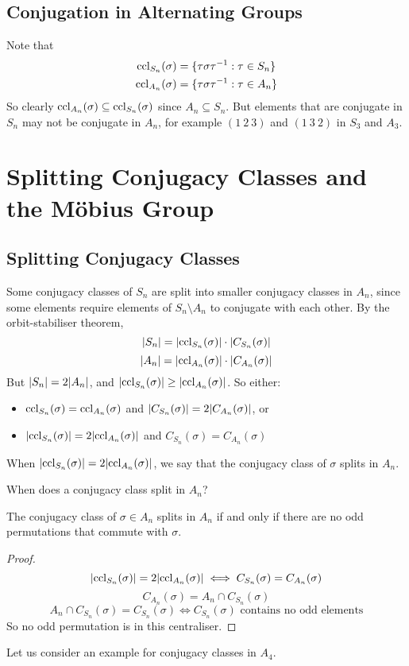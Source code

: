 \documentclass{article}
\begin{document}
\subsection{Conjugation in Alternating Groups}
Note that
\begin{align*}
    \operatorname{ccl}_{S_n}(\sigma) & = \{ \tau \sigma \tau^{-1} : \tau \in S_n \} \\
    \operatorname{ccl}_{A_n}(\sigma) & = \{ \tau \sigma \tau^{-1} : \tau \in A_n \}
\end{align*}
So clearly $\operatorname{ccl}_{A_n}(\sigma) \subseteq \operatorname{ccl}_{S_n}(\sigma)$ since $A_n \subseteq S_n$. But elements that are conjugate in $S_n$ may not be conjugate in $A_n$, for example $(1\ 2\ 3)$ and $(1\ 3\ 2)$ in $S_3$ and $A_3$.

\section{Splitting Conjugacy Classes and the M\"obius Group}
\subsection{Splitting Conjugacy Classes}
Some conjugacy classes of $S_n$ are split into smaller conjugacy classes in $A_n$, since some elements require elements of $S_n \setminus A_n$ to conjugate with each other. By the orbit-stabiliser theorem,
\[ \abs{S_n} = \abs{\operatorname{ccl}_{S_n}(\sigma)} \cdot \abs{C_{S_n}(\sigma)} \]
\[ \abs{A_n} = \abs{\operatorname{ccl}_{A_n}(\sigma)} \cdot \abs{C_{A_n}(\sigma)} \]
But $\abs{S_n} = 2\abs{A_n}$, and $\abs{\operatorname{ccl}_{S_n}(\sigma)} \geq \abs{\operatorname{ccl}_{A_n}(\sigma)}$. So either:
\begin{itemize}
    \item $\operatorname{ccl}_{S_n}(\sigma) = \operatorname{ccl}_{A_n}(\sigma)$ and $\abs{C_{S_n}(\sigma)} = 2\abs{C_{A_n}(\sigma)}$, or
    \item $\abs{\operatorname{ccl}_{S_n}(\sigma)} = 2 \abs{\operatorname{ccl}_{A_n}(\sigma)}$ and $C_{S_n}(\sigma) = C_{A_n}(\sigma)$
\end{itemize}
\begin{definition}
    When $\abs{\operatorname{ccl}_{S_n}(\sigma)} = 2 \abs{\operatorname{ccl}_{A_n}(\sigma)}$, we say that the conjugacy class of $\sigma$ splits in $A_n$.
\end{definition}
When does a conjugacy class split in $A_n$?
\begin{proposition}
    The conjugacy class of $\sigma \in A_n$ splits in $A_n$ if and only if there are no odd permutations that commute with $\sigma$.
\end{proposition}
\begin{proof}
    \[ \abs{\operatorname{ccl}_{S_n}(\sigma)} = 2 \abs{\operatorname{ccl}_{A_n}(\sigma)} \iff C_{S_n}(\sigma) = C_{A_n}(\sigma) \]
    \[ C_{A_n}(\sigma) = A_n \cap C_{S_n}(\sigma) \]
    \[ A_n \cap C_{S_n}(\sigma) = C_{S_n}(\sigma) \iff C_{S_n}(\sigma)\text{ contains no odd elements} \]
    So no odd permutation is in this centraliser.
\end{proof}
Let us consider an example for conjugacy classes in $A_4$.\medskip
\end{document}
